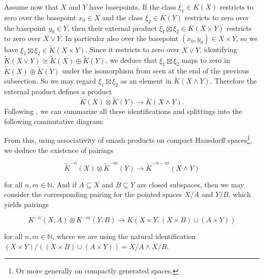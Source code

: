 \documentclass[12pt,a4paper]{amsart}
\theoremstyle{plain}
\theoremstyle{definition}
\theoremstyle{remark}
\begin{document}
Assume now that $X$ and $Y$ have basepoints.
If the class $\xi_{1} \in K(X)$ restricts to zero over the basepoint $x_{0} \in X$ and the class $\xi_{2} \in K(Y)$ restricts to zero over the basepoint $y_{0} \in Y$, then their external product $\xi_{1} \boxtimes \xi_{2} \in K(X \times Y)$ restricts to zero over $X \vee Y$.
In particular also over the basepoint $(x_{0},y_{0}) \in X \times Y$, so we have $\xi_{1} \boxtimes \xi_{2} \in \tilde{K}(X \times Y)$.
Since it restricts to zero over $X \vee Y$, identifying $\tilde{K}(X \vee Y) \cong \tilde{K}(X) \oplus \tilde{K}(Y)$, we deduce that $\xi_{1} \boxtimes \xi_{2}$ maps to zero in $\tilde{K}(X) \oplus \tilde{K}(Y)$ under the isomorphism from \cite[Corollary 2.4.8]{ati67} seen at the end of the previous subsection.
So we may regard $\xi_{1} \boxtimes \xi_{2}$ as an element in $\tilde{K}(X \wedge Y)$.
Therefore the external product defines a product
\[ \tilde{K}(X) \otimes \tilde{K}(Y) \to \tilde{K}(X \wedge Y). \]
Following \cite[p.~54]{hat03}, we can summarize all these identifications and splittings into the following commutative diagram:

\begin{center}
\end{center}

From this, using associativity of smash products on compact Hausdorff spaces\footnote{Or more generally on compactly generated spaces.}, we deduce the existence of pairings

\[ \tilde{K}^{-n}(X) \otimes \tilde{K}^{-m}(Y) \to \tilde{K}^{-n-m}(X \wedge Y) \]

for all $n, m \in \mathbb{N}$.
And if $A \subseteq X$ and $B \subseteq Y$ are closed subspaces, then we may consider the corresponding pairing for the pointed spaces $X/A$ and $Y/B$, which yields pairings

\[ K^{-n}(X,A) \otimes K^{-m}(Y,B) \to K(X \times Y, (X \times B) \cup (A \times Y)) \]

for all $n, m \in \mathbb{N}$, where we are using the natural identification $(X \times Y)/((X \times B)\cup (A \times Y)) = X/A \wedge X/B$.
\end{document}
